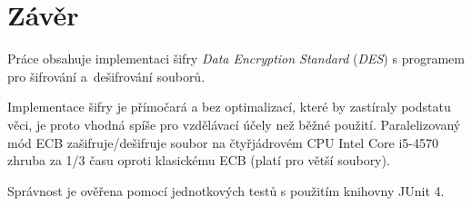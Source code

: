 \documentclass[12pt, a4paper]{article}
\begin{document}
\section{Závěr}
Práce obsahuje implementaci šifry \emph{Data Encryption Standard} (\emph{DES}) s programem pro šifrování a~dešifrování souborů.

Implementace šifry je přímočará a bez optimalizací, které by zastíraly podstatu věci, je proto vhodná spíše pro vzdělávací účely než běžné použití.
Paralelizovaný mód ECB zašifruje/dešifruje soubor na čtyřjádrovém CPU Intel Core i5-4570 zhruba za 1/3 času oproti klasickému ECB (platí pro větší soubory).

Správnost je ověřena pomocí jednotkových testů s použitím knihovny JUnit 4.




\end{document}
